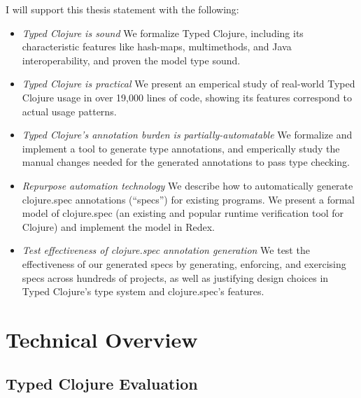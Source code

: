\documentclass[9pt]{extarticle}
\begin{document}
I will support this thesis statement with the following:

\begin{itemize}
  \item \emph{Typed Clojure is sound} We formalize Typed Clojure, including
    its characteristic features like hash-maps, multimethods, and Java interoperability,
    and proven the model type sound.
  \item \emph{Typed Clojure is practical} We present an emperical study of real-world Typed Clojure usage
    in over 19,000 lines of code, showing its features correspond to actual usage patterns.
  \item \emph{Typed Clojure's annotation burden is partially-automatable} We formalize and implement a tool to generate
    type annotations, and emperically study the manual changes needed for the generated annotations
    to pass type checking.
  \item \emph{Repurpose automation technology}
    We describe how to automatically generate clojure.spec annotations (``specs'') for existing programs.
    We present a formal model of clojure.spec (an existing and popular runtime verification tool for Clojure)
    and implement the model in Redex.
  \item \emph{Test effectiveness of clojure.spec annotation generation}
    We test the effectiveness of our generated specs by generating, enforcing, and exercising specs
    across hundreds of projects, as well as justifying design choices in Typed Clojure's type system and
    clojure.spec's features.
\end{itemize}

\section{Technical Overview}



\subsection{Typed Clojure Evaluation}
\label{sec:casestudy}
\end{document}
